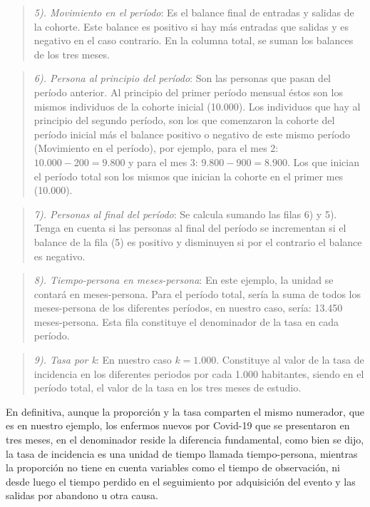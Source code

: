 \documentclass[
]{book}
\begin{document}
\begin{quote}
\emph{5). Movimiento en el período}: Es el balance final de entradas y salidas de
la cohorte. Este balance es positivo si hay más entradas que salidas y es negativo en el caso contrario. En la columna total, se suman los balances de los tres meses.
\end{quote}

\begin{quote}
\emph{6). Persona al principio del período}: Son las personas que pasan del
período anterior. Al principio del primer período mensual éstos son los
mismos individuos de la cohorte inicial (10.000). Los individuos que hay al principio del segundo período, son los que comenzaron la cohorte del período inicial más el balance positivo o negativo de este mismo período (Movimiento en el período), por ejemplo, para el mes 2: \(10.000-200=9.800\) y para el mes 3: \(9.800-900=8.900\). Los que inician el período total son los mismos que inician la cohorte en el primer mes (10.000).
\end{quote}

\begin{quote}
\emph{7). Personas al final del período}: Se calcula sumando las filas 6) y 5). Tenga en cuenta si las personas al final del período se incrementan si el balance de la fila (5) es positivo y disminuyen si por el contrario el balance es negativo.
\end{quote}

\begin{quote}
\emph{8). Tiempo-persona en meses-persona}: En este ejemplo, la unidad se contará en meses-persona. Para el período total, sería la suma de todos los meses-persona de los diferentes períodos, en nuestro caso, sería: 13.450 meses-persona. Esta fila constituye el denominador de la tasa en cada período.
\end{quote}

\begin{quote}
\emph{9). Tasa por k}: En nuestro caso \(k=1.000\). Constituye al valor de la tasa de incidencia en los diferentes periodos por cada 1.000 habitantes, siendo en el período total, el valor de la tasa en los tres meses de estudio.
\end{quote}

En definitiva, aunque la proporción y la tasa comparten el mismo numerador, que es en nuestro ejemplo, los enfermos nuevos por Covid-19 que se presentaron en tres meses, en el denominador reside la diferencia fundamental, como bien se dijo, la tasa de incidencia es una unidad de tiempo llamada tiempo-persona, mientras la proporción no tiene en cuenta variables como el tiempo de observación, ni desde luego el tiempo perdido en el seguimiento por adquisición del evento y las salidas por abandono u otra causa.
\end{document}

